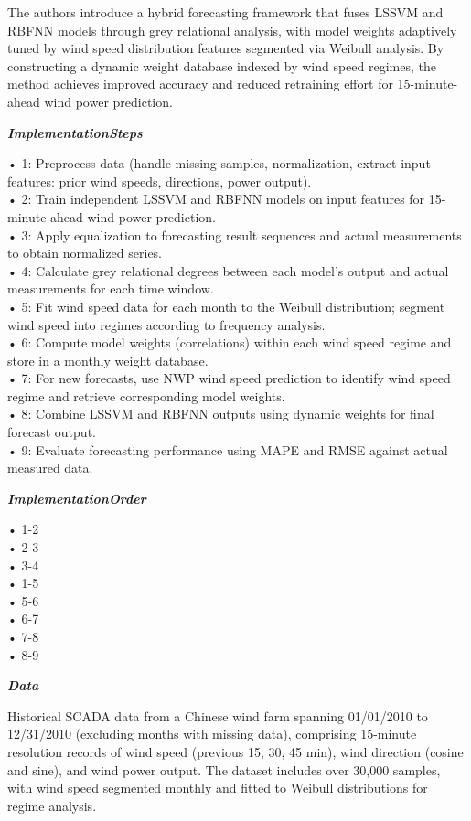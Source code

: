 \begin{tcolorbox}[
    breakable,
    title={Example of Idea Generation in Energy},
    colback=LighterGray,
    colframe=DeepPurple,
    colbacktitle=DeepPurple,
    coltitle=White,
]
The authors introduce a hybrid forecasting framework that fuses LSSVM and RBFNN models through grey
relational analysis, with model weights adaptively tuned by wind speed distribution features
segmented via Weibull analysis. By constructing a dynamic weight database indexed by wind speed
regimes, the method achieves improved accuracy and reduced retraining effort for 15-minute-ahead
wind power prediction.

\textbf{\emph{\textcolor{CaseOrange}{ImplementationSteps}}}

• 1: Preprocess data (handle missing samples, normalization, extract input features: prior wind speeds, directions, power output). \\
• 2: Train independent LSSVM and RBFNN models on input features for 15-minute-ahead wind power prediction. \\
• 3: Apply equalization to forecasting result sequences and actual measurements to obtain normalized series. \\
• 4: Calculate grey relational degrees between each model's output and actual measurements for each time window. \\
• 5: Fit wind speed data for each month to the Weibull distribution; segment wind speed into regimes according to frequency analysis. \\
• 6: Compute model weights (correlations) within each wind speed regime and store in a monthly weight database. \\
• 7: For new forecasts, use NWP wind speed prediction to identify wind speed regime and retrieve corresponding model weights. \\
• 8: Combine LSSVM and RBFNN outputs using dynamic weights for final forecast output. \\
• 9: Evaluate forecasting performance using MAPE and RMSE against actual measured data. 

\textbf{\emph{\textcolor{CaseOrange}{ImplementationOrder}}}

• 1-2 \\
• 2-3 \\
• 3-4 \\
• 1-5 \\
• 5-6 \\
• 6-7 \\
• 7-8 \\
• 8-9 

\textbf{\emph{\textcolor{CaseOrange}{Data}}}

Historical SCADA data from a Chinese wind farm spanning 01/01/2010 to 12/31/2010 (excluding months
with missing data), comprising 15-minute resolution records of wind speed (previous 15, 30, 45 min),
wind direction (cosine and sine), and wind power output. The dataset includes over 30,000 samples,
with wind speed segmented monthly and fitted to Weibull distributions for regime analysis.


\end{tcolorbox}

